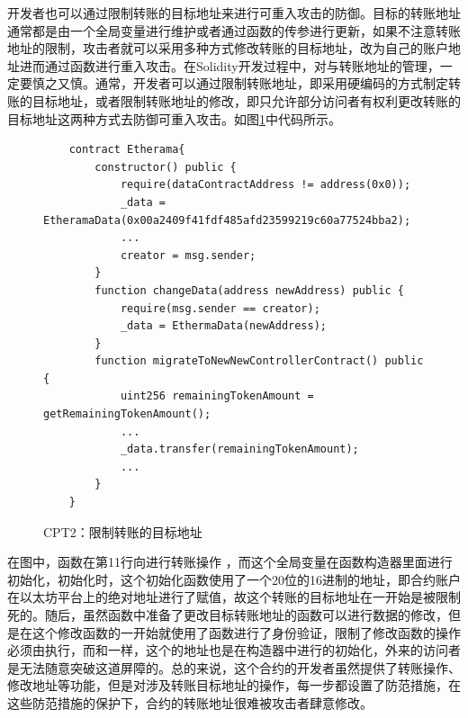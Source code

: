 开发者也可以通过限制转账的目标地址来进行可重入攻击的防御。目标的转账地址通常都是由一个全局变量进行维护或者通过函数的传参进行更新，如果不注意转账地址的限制，攻击者就可以采用多种方式修改转账的目标地址，改为自己的账户地址进而通过函数进行重入攻击。在Solidity开发过程中，对与转账地址的管理，一定要慎之又慎。通常，开发者可以通过限制转账地址，即采用硬编码的方式制定转账的目标地址，或者限制转账地址的修改，即只允许部分访问者有权利更改转账的目标地址这两种方式去防御可重入攻击。如图\ref{fig:ss2_example}中代码所示。
\begin{figure}
\begin{minipage}[htbp]{1.0\linewidth}
    \begin{lstlisting}
    contract Etherama{
        constructor() public {
            require(dataContractAddress != address(0x0));
            _data = EtheramaData(0x00a2409f41fdf485afd23599219c60a77524bba2);
            ...
            creator = msg.sender;
        }
        function changeData(address newAddress) public {
            require(msg.sender == creator);
            _data = EthermaData(newAddress);
        }
        function migrateToNewNewControllerContract() public {
            uint256 remainingTokenAmount = getRemainingTokenAmount();
            ...
            _data.transfer(remainingTokenAmount);
            ...
        }
    }
\end{lstlisting}
\end{minipage}
\vspace{-5mm}
\caption{CPT2：限制转账的目标地址}
\label{fig:ss2_example}
\end{figure}
在图中，函数在第11行向进行转账操作 ，而这个全局变量在函数构造器里面进行初始化，初始化时，这个初始化函数使用了一个20位的16进制的地址，即合约账户在以太坊平台上的绝对地址进行了赋值，故这个转账的目标地址在一开始是被限制死的。随后，虽然函数中准备了更改目标转账地址的函数可以进行数据的修改，但是在这个修改函数的一开始就使用了函数进行了身份验证，限制了修改函数的操作必须由执行，而和一样，这个的地址也是在构造器中进行的初始化，外来的访问者是无法随意突破这道屏障的。总的来说，这个合约的开发者虽然提供了转账操作、修改地址等功能，但是对涉及转账目标地址的操作，每一步都设置了防范措施，在这些防范措施的保护下，合约的转账地址很难被攻击者肆意修改。

